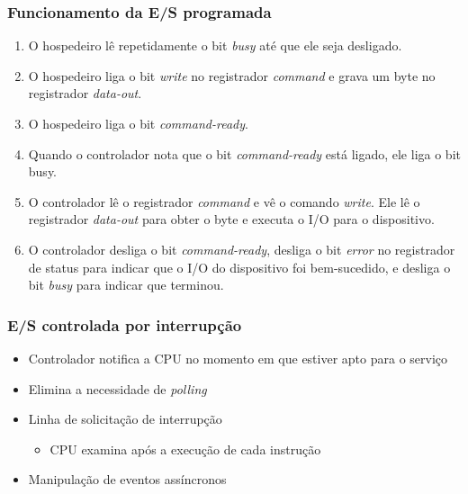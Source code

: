 \documentclass[aspectratio=169,
				xcolor=table]{beamer}
\begin{document}
	\begin{frame}[allowframebreaks]
		\frametitle{Funcionamento da E/S programada}
		\begin{enumerate}
			\item O hospedeiro lê repetidamente o bit \textit{busy} até que ele seja desligado.
			\vspace{1em}
			\item O hospedeiro liga o bit \textit{write} no registrador \textit{command} e grava um byte no registrador \textit{data-out}.
			\vspace{1em}
			\item O hospedeiro liga o bit \textit{command-ready}.
			\framebreak
			\item Quando o controlador nota que o bit \textit{command-ready} está ligado, ele liga o bit busy.
			\vspace{1em}
			\item O controlador lê o registrador \textit{command} e vê o comando \textit{write}. Ele lê o registrador \textit{data-out} para obter o byte e executa o I/O para o dispositivo.
			\vspace{1em}
			\item O controlador desliga o bit \textit{command-ready}, desliga o bit \textit{error} no registrador de status para indicar que o I/O do dispositivo foi bem-sucedido, e desliga o bit \textit{busy} para indicar que terminou. 
		\end{enumerate}
	\end{frame}

	
	\begin{frame}
		\frametitle{E/S controlada por interrupção}
		\begin{itemize}
			\item Controlador notifica a CPU no momento em que estiver apto para o serviço			
			\vspace{1em}
			\item Elimina a necessidade de \textit{polling}
			\vspace{1em}
			\item Linha de solicitação de interrupção
			\begin{itemize}
				\item CPU examina após a execução de cada instrução
			\end{itemize}
			\vspace{1em}
			\item Manipulação de eventos assíncronos
		\end{itemize}
	\end{frame}
	
\end{document}
